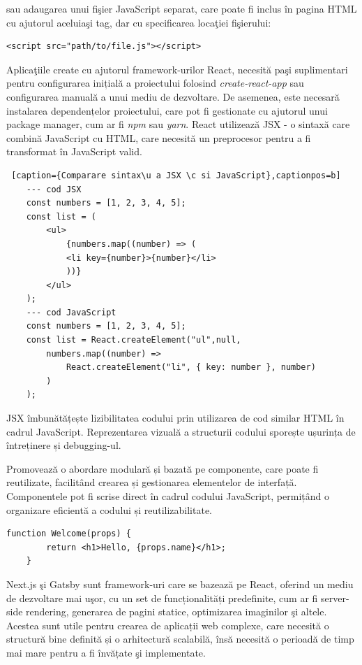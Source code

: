\documentclass[12pt, a4paper]{report}
\begin{document}
sau adaugarea unui fi\c sier JavaScript separat, care poate fi inclus \^ in pagina HTML cu ajutorul aceluia\c si tag, dar cu specificarea loca\c tiei fi\c sierului:

\begin{lstlisting}[caption={Exemplu de ad\u augare a unui script dintr-un fi\c sier extern},captionpos=b]
	<script src="path/to/file.js"></script>
\end{lstlisting}

Aplica\c tiile create cu ajutorul framework-urilor React, necesit\u a pa\c si suplimentari pentru configurarea inițială a proiectului folosind \textit{create-react-app} sau configurarea manuală a unui mediu de dezvoltare. De asemenea, este necesar\u a instalarea dependențelor proiectului, care pot fi gestionate cu ajutorul unui package manager, cum ar fi \textit{npm} sau \textit{yarn}. React utilizează JSX - o sintaxă care combină JavaScript cu HTML, care necesită un preprocesor pentru a fi transformat în JavaScript valid.

\begin{lstlisting} [caption={Comparare sintax\u a JSX \c si JavaScript},captionpos=b]
	--- cod JSX
	const numbers = [1, 2, 3, 4, 5];
	const list = (
		<ul>
			{numbers.map((number) => (
			<li key={number}>{number}</li>
			))}
		</ul>
	);
	--- cod JavaScript
	const numbers = [1, 2, 3, 4, 5];
	const list = React.createElement("ul",null,
		numbers.map((number) =>
			React.createElement("li", { key: number }, number)
		)
	);

\end{lstlisting}

JSX îmbunătățește lizibilitatea codului prin utilizarea de cod similar HTML în cadrul JavaScript. Reprezentarea vizuală a structurii codului sporește ușurința de întreținere și debugging-ul.

Promovează o abordare modulară și bazată pe componente, care poate fi reutilizate, facilit\^and crearea și gestionarea elementelor de interfață. Componentele pot fi scrise direct în cadrul codului JavaScript, permițând o organizare eficientă a codului și reutilizabilitate.

\begin{lstlisting}[caption={Exemplu de component\u a React},captionpos=b]
	function Welcome(props) {
		return <h1>Hello, {props.name}</h1>;
	}
\end{lstlisting}

Next.js \c si Gatsby sunt framework-uri care se bazeaz\u a pe React, oferind un mediu de dezvoltare mai u\c sor, cu un set de funcționalități predefinite, cum ar fi server-side rendering, generarea de pagini statice, optimizarea imaginilor \c si altele. Acestea sunt utile pentru crearea de aplicații web complexe, care necesită o structură bine definită și o arhitectură scalabilă, \^ins\u a necesit\u a o perioad\u a de timp mai mare pentru a fi \^inv\u ațate \c si implementate.
\end{document}
